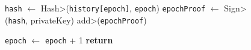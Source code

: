 \begin{figure}[t!]
\begin{adjustbox}{minipage=[t]{\columnwidth}}
\begin{algorithm}[H]
\begin{algorithmic}[1]
                	\State \texttt{hash} $\leftarrow$ \<Hash>(\texttt{history[epoch]}, \texttt{epoch})
                \State \texttt{epochProof} $\leftarrow$  \<Sign>(\texttt{hash}, privateKey)
                \State \<add>(\texttt{epochProof})
                	
                	\State \texttt{epoch} $\leftarrow$ \texttt{epoch} + 1
                \State \textbf{return}
            \EndFunction
        \end{algorithmic}
      \end{algorithm}
	\end{adjustbox}
  \end{figure}


